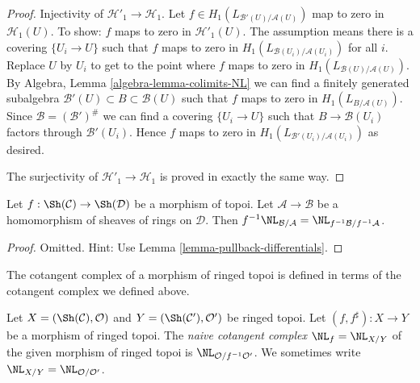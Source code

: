 \begin{proof}
\medskip\noindent
Injectivity of $\mathcal{H}'_1 \to \mathcal{H}_1$. Let
$f \in H_1(L_{\mathcal{B}'(U)/\mathcal{A}(U)})$ map to zero
in $\mathcal{H}_1(U)$. To show: $f$ maps to zero in
$\mathcal{H}'_1(U)$. The assumption means there is a covering
$\{U_i \to U\}$ such that $f$ maps to zero in
$H_1(L_{\mathcal{B}(U_i)/\mathcal{A}(U_i)})$ for all $i$.
Replace $U$ by $U_i$ to get to the point where $f$ maps to zero
in $H_1(L_{\mathcal{B}(U)/\mathcal{A}(U)})$.
By Algebra, Lemma \ref{algebra-lemma-colimits-NL}
we can find a finitely generated subalgebra
$\mathcal{B}'(U) \subset B \subset \mathcal{B}(U)$ such
that $f$ maps to zero in $H_1(L_{B/\mathcal{A}(U)})$.
Since $\mathcal{B} = (\mathcal{B}')^\#$ we can find a covering
$\{U_i \to U\}$ such that $B \to \mathcal{B}(U_i)$ factors
through $\mathcal{B}'(U_i)$. Hence $f$ maps to zero in
$H_1(L_{\mathcal{B}'(U_i)/\mathcal{A}(U_i)})$ as desired.

\medskip\noindent
The surjectivity of $\mathcal{H}'_1 \to \mathcal{H}_1$ is proved
in exactly the same way.
\end{proof}

\begin{lemma}
\label{lemma-pullback-NL}
Let $f : \Sh(\mathcal{C}) \to \Sh(\mathcal{D})$ be a morphism of topoi.
Let $\mathcal{A} \to \mathcal{B}$ be a homomorphism of sheaves of rings
on $\mathcal{D}$. Then $f^{-1}\NL_{\mathcal{B}/\mathcal{A}} =
\NL_{f^{-1}\mathcal{B}/f^{-1}\mathcal{A}}$.
\end{lemma}

\begin{proof}
Omitted. Hint: Use Lemma \ref{lemma-pullback-differentials}.
\end{proof}

\noindent
The cotangent complex of a morphism of ringed topoi is defined
in terms of the cotangent complex we defined above.

\begin{definition}
\label{definition-cotangent-complex-morphism-ringed-topoi}
Let $X = (\Sh(\mathcal{C}), \mathcal{O})$ and
$Y = (\Sh(\mathcal{C}'), \mathcal{O}')$ be ringed topoi.
Let $(f, f^\sharp) : X \to Y$ be a morphism of ringed topoi.
The {\it naive cotangent complex} $\NL_f = \NL_{X/Y}$
of the given morphism of ringed topoi is
$\NL_{\mathcal{O}/f^{-1}\mathcal{O}'}$.
We sometimes write $\NL_{X/Y} = \NL_{\mathcal{O}/\mathcal{O}'}$.
\end{definition}









